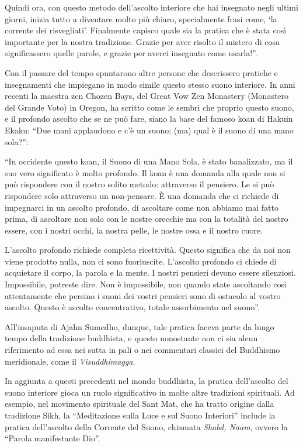 Quindi ora, con questo metodo dell'ascolto interiore che hai insegnato
negli ultimi giorni, inizia tutto a diventare molto più chiaro,
specialmente frasi come, `la corrente dei risvegliati'. Finalmente
capisco quale sia la pratica che è stata così importante per la nostra
tradizione. Grazie per aver risolto il mistero di cosa significassero
quelle parole, e grazie per averci insegnato come usarla!''.

Con il passare del tempo spuntarono altre persone che descrissero
pratiche e insegnamenti che impiegano in modo simile questo stesso suono
interiore. In anni recenti la maestra zen Chozen Bays, del Great Vow Zen
Monastery (Monastero del Grande Voto) in Oregon, ha scritto come le
sembri che proprio questo suono, e il profondo ascolto che se ne può
fare, siano la base del famoso koan di Hakuin Ekaku: ``Due mani
applaudono e c'è un suono; (ma) qual è il suono di una mano sola?'':

``In occidente questo koan, il Suono di una Mano Sola, è stato
banalizzato, ma il suo vero significato è molto profondo. Il koan è una
domanda alla quale non si può rispondere con il nostro solito metodo:
attraverso il pensiero. Le si può rispondere solo attraverso un
non-pensare. È una domanda che ci richiede di impegnarci in un ascolto
profondo, di ascoltare come non abbiamo mai fatto prima, di ascoltare
non solo con le nostre orecchie ma con la totalità del nostro essere,
con i nostri occhi, la nostra pelle, le nostre ossa e il nostro cuore.

L'ascolto profondo richiede completa ricettività. Questo significa che
da noi non viene prodotto nulla, non ci sono fuoriuscite. L'ascolto
profondo ci chiede di acquietare il corpo, la parola e la mente. I
nostri pensieri devono essere silenziosi. Impossibile, potreste dire.
Non è impossibile, non quando state ascoltando così attentamente che
persino i suoni dei vostri pensieri sono di ostacolo al vostro ascolto.
Questo è ascolto concentrativo, totale assorbimento nel suono''.\cite{deep}

All'insaputa di Ajahn Sumedho, dunque, tale pratica faceva parte da
lungo tempo della tradizione buddhista, e questo nonostante non ci sia
alcun riferimento ad essa nei sutta in pali o nei commentari classici
del Buddhismo meridionale, come il \emph{Visuddhimagga}.

In aggiunta a questi precedenti nel mondo buddhista, la pratica
dell'ascolto del suono interiore gioca un ruolo significativo in molte
altre tradizioni spirituali. Ad esempio, nel movimento spirituale del
Sant Mat, che ha tratto origine dalla tradizione Sikh, la ``Meditazione
sulla Luce e sul Suono Interiori'' include la pratica dell'ascolto della
Corrente del Suono, chiamata \emph{Shabd, Naam}, ovvero la ``Parola
manifestante Dio''.

